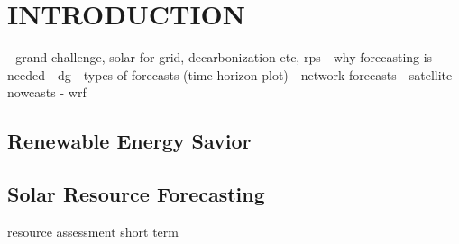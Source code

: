 \chapter{INTRODUCTION}
\label{chap:intro}

- grand challenge, solar for grid, decarbonization etc, rps
- why forecasting is needed
- dg
- types of forecasts (time horizon plot)
- network forecasts
- satellite nowcasts
- wrf

\section{Renewable Energy Savior}

\section{Solar Resource Forecasting}
resource assessment
short term



